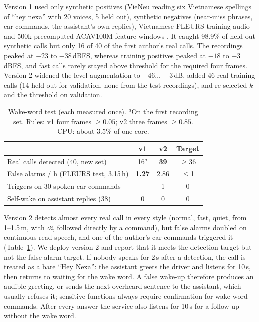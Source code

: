 Version 1 used only synthetic positives (VieNeu reading six Vietnamese spellings of ``hey nexa'' with 20 voices, 5 held out),
synthetic negatives (near-miss phrases, car commands, the assistant's own replies), Vietnamese FLEURS training audio and 500k
precomputed ACAV100M feature windows \citep{lee2021acav100m}. It caught 98.9\% of held-out synthetic calls but only 16 of 40 of
the first author's real calls. The recordings peaked at $-23$ to $-38$\,dBFS, whereas training positives peaked at $-18$ to $-3$\,dBFS, and fast calls rarely stayed
above threshold for the required four frames. Version 2 widened the level augmentation to $-46\ldots-3$\,dB, added 46 real
training calls (14 held out for validation, none from the test recordings), and re-selected $k$ and the threshold on
validation.

\begin{table}[t]
\centering\small
\setlength{\tabcolsep}{4pt}
\begin{tabular}{@{}lccc@{}}
\toprule
& v1 & v2 & Target \\
\midrule
Real calls detected (40, new set) & 16$^{a}$ & \textbf{39} & $\ge$36 \\
False alarms / h (FLEURS test, 3.15\,h) & \textbf{1.27} & 2.86 & $\le$1 \\
Triggers on 30 spoken car commands & -- & 1 & 0 \\
Self-wake on assistant replies (38) & 0 & 0 & 0 \\
\bottomrule
\end{tabular}
\caption{Wake-word test (each measured once). $^{a}$On the first recording set. Rules: v1 four frames $\ge0.05$; v2 three
frames $\ge0.85$. CPU: about 3.5\% of one core.}
\label{tab:wake}
\end{table}

Version 2 detects almost every real call in every style (normal, fast, quiet, from 1--1.5\,m, with \textit{ơi}, followed
directly by a command), but false alarms doubled on continuous read speech, and one of the author's car commands triggered it
(Table~\ref{tab:wake}). We deploy version 2 and report that it meets the detection target but not the false-alarm target. If
nobody speaks for 2\,s after a detection, the call is treated as a bare ``Hey Nexa'': the assistant greets the driver and
listens for 10\,s, then returns to waiting for the wake word. A false wake-up therefore produces an audible greeting, or sends
the next overheard sentence to the assistant, which usually refuses it; sensitive functions always require confirmation for
wake-word commands. After every answer the service also listens for 10\,s for a follow-up without the wake word.

